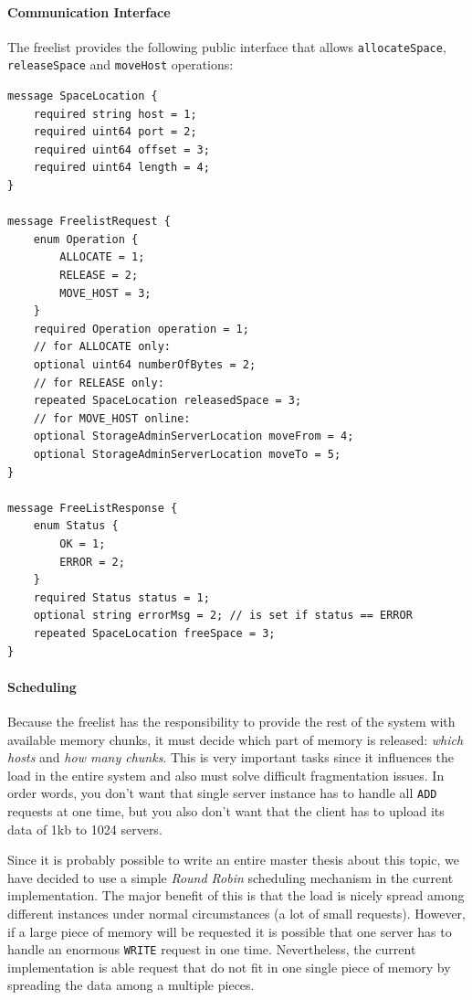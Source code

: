 \documentclass[12pt,a4paper]{scrartcl}
\begin{document}
\paragraph{Communication Interface}
The freelist provides the following public interface that allows \verb|allocateSpace|, \verb|releaseSpace| and \verb|moveHost| operations:
\begin{verbatim}
message SpaceLocation {
    required string host = 1;
    required uint64 port = 2;
    required uint64 offset = 3;
    required uint64 length = 4;
}

message FreelistRequest {
    enum Operation {
        ALLOCATE = 1;
        RELEASE = 2;
        MOVE_HOST = 3;
    }
    required Operation operation = 1;
    // for ALLOCATE only:
    optional uint64 numberOfBytes = 2;
    // for RELEASE only:
    repeated SpaceLocation releasedSpace = 3;
    // for MOVE_HOST online:
    optional StorageAdminServerLocation moveFrom = 4;
    optional StorageAdminServerLocation moveTo = 5;
}

message FreeListResponse {
    enum Status {
        OK = 1;
        ERROR = 2;
    }
    required Status status = 1;
    optional string errorMsg = 2; // is set if status == ERROR
    repeated SpaceLocation freeSpace = 3;
}
\end{verbatim}

\paragraph{Scheduling}
Because the freelist has the responsibility to provide the rest of the system with available memory chunks, it must decide which part of memory is released: \emph{which hosts} and \emph{how many chunks}. This is very important tasks since it influences the load in the entire system and also must solve difficult fragmentation issues. In order words, you don't want that single server instance has to handle all \verb|ADD| requests at one time, but you also don't want that the client has to upload its data of 1kb to 1024 servers.

Since it is probably possible to write an entire master thesis about this topic, we have decided to use a simple \emph{Round Robin} scheduling mechanism in the current implementation. The major benefit of this is that the load is nicely spread among different instances under normal circumstances (a lot of small requests). However, if a large piece of memory will be requested it is possible that one server has to handle an enormous \verb|WRITE| request in one time. Nevertheless, the current implementation is able request that do not fit in one single piece of memory by spreading the data among a multiple pieces.
\end{document}
